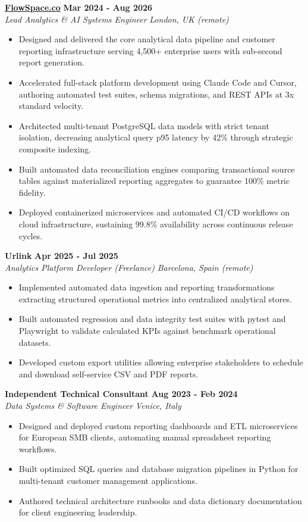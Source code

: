 \documentclass[10pt,a4paper]{article}
\newcommand{\role}[4]{%
  \textbf{#1} \hfill \textbf{#2}\\[1pt]%
  \textit{#3} \hfill \textit{#4}\\[2pt]%
}
\begin{document}
\role{\href{https://flowspace.co}{FlowSpace.co}}{Mar 2024 - Aug 2026}{Lead Analytics \& AI Systems Engineer}{London, UK (remote)}
\begin{itemize}
  \item Designed and delivered the core analytical data pipeline and customer reporting infrastructure serving 4,500+ enterprise users with sub-second report generation.
  \item Accelerated full-stack platform development using Claude Code and Cursor, authoring automated test suites, schema migrations, and REST APIs at 3x standard velocity.
  \item Architected multi-tenant PostgreSQL data models with strict tenant isolation, decreasing analytical query p95 latency by 42\% through strategic composite indexing.
  \item Built automated data reconciliation engines comparing transactional source tables against materialized reporting aggregates to guarantee 100\% metric fidelity.
  \item Deployed containerized microservices and automated CI/CD workflows on cloud infrastructure, sustaining 99.8\% availability across continuous release cycles.
\end{itemize}

\role{Urlink}{Apr 2025 - Jul 2025}{Analytics Platform Developer (Freelance)}{Barcelona, Spain (remote)}
\begin{itemize}
  \item Implemented automated data ingestion and reporting transformations extracting structured operational metrics into centralized analytical stores.
  \item Built automated regression and data integrity test suites with pytest and Playwright to validate calculated KPIs against benchmark operational datasets.
  \item Developed custom export utilities allowing enterprise stakeholders to schedule and download self-service CSV and PDF reports.
\end{itemize}

\role{Independent Technical Consultant}{Aug 2023 - Feb 2024}{Data Systems \& Software Engineer}{Venice, Italy}
\begin{itemize}
  \item Designed and deployed custom reporting dashboards and ETL microservices for European SMB clients, automating manual spreadsheet reporting workflows.
  \item Built optimized SQL queries and database migration pipelines in Python for multi-tenant customer management applications.
  \item Authored technical architecture runbooks and data dictionary documentation for client engineering leadership.
\end{itemize}
\end{document}
